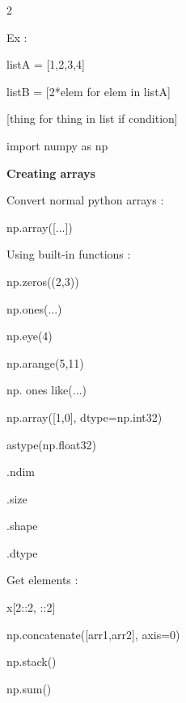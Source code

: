 \documentclass[a4paper,10pt]{article}
\begin{document}
\begin{multicols}{2}

\begin{tcolorbox}

\vspace{2mm}

Ex :

listA = [1,2,3,4]

listB = [2*elem for elem in listA]

\vspace{2mm}

[thing for thing in list if condition]
\end{tcolorbox}

\begin{tcolorbox}[title=NumPy]
import numpy as np

\vspace{2mm}

\textbf{Creating arrays}

Convert normal python arrays :

np.array([...])

\vspace{2mm}

Using built-in functions :

np.zeros((2,3))

np.ones(...)

np.eye(4)

np.arange(5,11)

np. ones like(...)

\vspace{2mm}

np.array([1,0], dtype=np.int32)

astype(np.float32)

\vspace{2mm}

.ndim

.size

.shape

.dtype

\vspace{2mm}

Get elements :

x[2::2, ::2]

\vspace{2mm}

np.concatenate([arr1,arr2], axis=0)

np.stack()

np.sum()


\end{tcolorbox}
\end{multicols}
\end{document}
